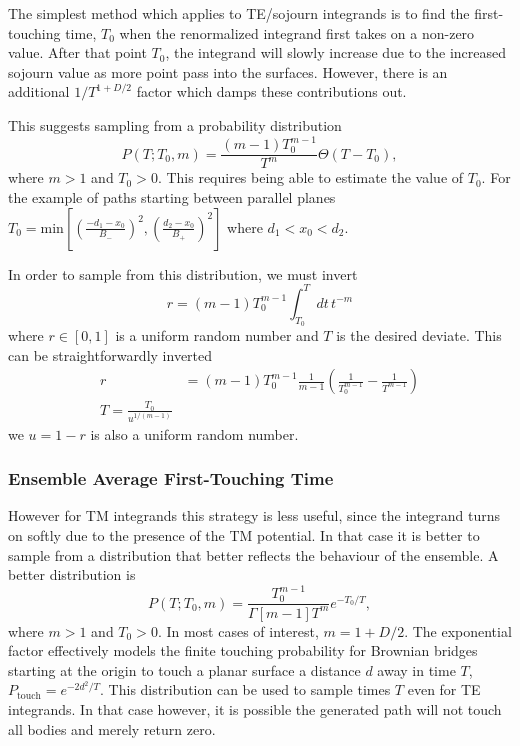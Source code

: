 The simplest method which applies to TE/sojourn integrands is to find the first-touching time, $T_0$
when the renormalized integrand first takes on a non-zero value.  After that point $T_0$, the
integrand will slowly increase due to the increased sojourn value as more point pass into the 
surfaces.  However, there is an additional $1/T^{1+D/2}$ factor which damps these contributions out.

This suggests sampling from a probability distribution 
\begin{equation}
  P(T;T_0,m)= \frac{(m-1) T_0^{m-1}}{T^m}\Theta(T-T_0),
\end{equation}
where $m>1$ and $T_0>0$.  This requires being able to estimate the value of $T_0$.  For the example
of paths starting between parallel planes $T_0=\text{min}[\left(\frac{-d_1-x_0}{B_-}\right)^2,
\left(\frac{d_2-x_0}{B_+}\right)^2]$ where $d_1<x_0<d_2$.    

In order to sample from this distribution, we must invert 
\begin{equation}
  r=(m-1) T_0^{m-1}\int_{T_0}^T dt\, t^{-m}
\end{equation}
where $r\in [0,1]$ is a uniform random number and $T$ is the desired deviate.    
This can be straightforwardly inverted 
\begin{align}
  r&=(m-1) T_0^{m-1}\frac{1}{m-1}\left(\frac{1}{T_0^{m-1}}-\frac{1}{T^{m-1}}\right)\\
 T= \frac{T_0}{u^{1/(m-1)}}
\end{align}
we $u=1-r$ is also a uniform random number. 



\subsubsection{Ensemble Average First-Touching Time}

However for TM integrands this strategy is less useful, since the integrand turns on softly
due to the presence of the TM potential.  In that case it is better to sample from a distribution
that better reflects the behaviour of the ensemble.  A better distribution is 
\begin{equation}
  P(T;T_0,m) = \frac{T_0^{m-1}}{\Gamma[m-1] T^m}e^{-T_0/T},
\end{equation}
where $m>1$ and $T_0>0$.  In most cases of interest, $m=1+D/2$.  The exponential factor effectively models the finite touching 
probability for Brownian bridges starting at the origin to touch a planar surface a distance $d$ 
away in time $T$, $P_\text{touch}=e^{-2d^2/T}$.   This distribution can be used to sample times $T$
even for TE integrands.  In that case however, it is possible the generated path will not
touch all bodies and merely return zero.    

